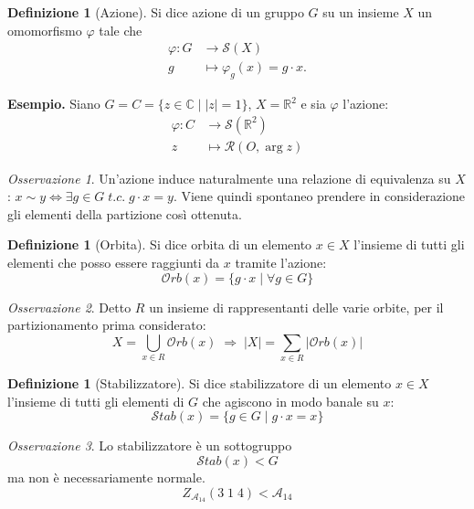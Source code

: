 \documentclass[a4paper]{article}
\theoremstyle{remark}
\newtheorem*{remark}{Osservazione}
\theoremstyle{definition}
\newtheorem{definition}[theorem]{Definizione}
\newcommand{\Orb}[1]{\mathcal{O}rb\left( #1 \right)}
\newcommand{\Stab}[1]{\mathcal{S}tab\left( #1 \right)}
\begin{document}
\begin{multicols}{2}
\begin{definition}[Azione]
	Si dice azione di un gruppo $ G $ su un insieme $ X $ un omomorfismo $ \varphi $ tale che \begin{align*}
	\varphi \colon G &\to \mathcal{S}\left(X\right) \\
	g &\mapsto \varphi_g(x) = g \cdot x.
	\end{align*}
\end{definition}

\textbf{Esempio.} Siano $ G = C = \{ z \in \mathbb{C} \mid |z| = 1 \} $, $ X = \mathbb{R}^2 $ e sia $ \varphi $ l'azione: \begin{align*}
\varphi \colon C &\to \mathcal{S}\left(\mathbb{R}^2\right) \\
z &\mapsto \mathcal{R}(O, \arg z)
\end{align*}

\begin{remark}
	Un'azione induce naturalmente una relazione di equivalenza su $ X $: $ x \sim y \Leftrightarrow \exists g \in G \; t.c.\; g \cdot x = y $. Viene quindi spontaneo prendere in considerazione gli elementi della partizione così ottenuta. 
\end{remark}
\begin{definition}[Orbita]
	Si dice orbita di un elemento $ x \in X $ l'insieme di tutti gli elementi che posso essere raggiunti da $ x $ tramite l'azione: \[ \Orb{x} = \{ g \cdot x \mid \forall g \in G \} \]
\end{definition}
\begin{remark}
	Detto $ R $ un insieme di rappresentanti delle varie orbite, per il partizionamento prima considerato: \[ X = \bigcup_{x \in R} \Orb{x} \;\Rightarrow\; |X| = \sum_{x \in R} |\Orb{x}| \]
\end{remark}

\begin{definition}[Stabilizzatore]
	Si dice stabilizzatore di un elemento $ x \in X $ l'insieme di tutti gli elementi di $ G $ che agiscono in modo banale su $ x $: \[ \Stab{x} = \{ g \in G \mid g \cdot x = x \} \]
\end{definition}
\begin{remark}
	Lo stabilizzatore è un sottogruppo $$ \Stab{x} < G $$ ma non è necessariamente normale. $$  Z_{\mathcal{A}_{14}}(3 \; 1 \; 4) < \mathcal{A}_{14}$$
\end{remark}


\end{multicols}
\end{document}
